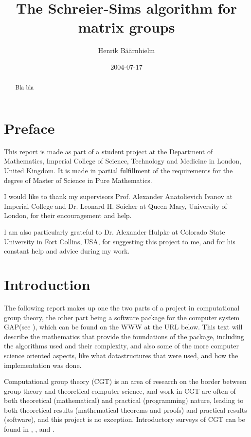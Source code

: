 \documentclass[draft]{amsart}
\title{The Schreier-Sims algorithm for matrix groups}
\author{Henrik B\"a\"arnhielm}
\date{2004-07-17}
\theoremstyle{plain}
\theoremstyle{definition}
\theoremstyle{remark}
\newcommand{\GAP}{\textsf{GAP}}
\begin{document}
\begin{titlepage}
\begin{abstract}
Bla bla
\end{abstract}


\maketitle
\thispagestyle{empty}

\end{titlepage}

\tableofcontents

\newpage

\section{Preface}

This report is made as part of a student project at the Department of
Mathematics, Imperial College of Science, Technology and Medicine in
London, United Kingdom. It is made in partial fulfillment of the
requirements for the degree of Master of Science in Pure Mathematics.

I would like to thank my supervisors Prof. Alexander Anatolievich
Ivanov at Imperial College and Dr. Leonard H. Soicher at Queen Mary,
University of London, for their encouragement and help.

I am also particularly grateful to Dr. Alexander Hulpke at Colorado
State University in Fort Collins, USA, for suggesting this project to
me, and for his constant help and advice during my work.

\section{Introduction}
The following report makes up one the two parts of a project in
computational group theory, the other part being a software package
for the computer system \GAP (see \cite{GAP}), which can be found on
the WWW at the URL below. This text will describe the mathematics that
provide the foundations of the package, including the algorithms used and their complexity,
and also some of the more computer science oriented aspects, like what
datastructures that were used, and how the implementation was done.

Computational group theory (CGT) is an area of research on the border
between group theory and theoretical computer science, and work in CGT
are often of both theoretical (mathematical) and practical
(programming) nature, leading to both theoretical results
(mathematical theorems and proofs) and practical results (software),
and this project is no exception. Introductory surveys of CGT can be
found in \cite{sims98}, \cite{seress97}, \cite{neubuser95} and \cite{cannon92}.
\end{document}
